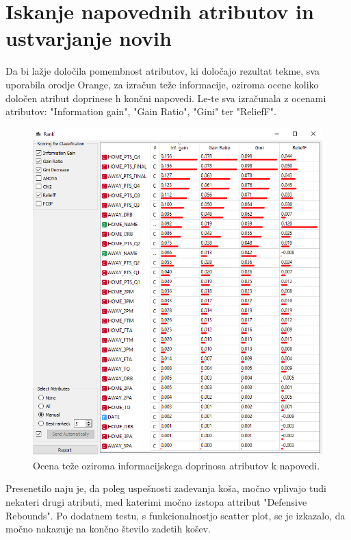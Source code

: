 \documentclass[a4paper,11pt]{article}
\begin{document}
\section{Iskanje napovednih atributov in ustvarjanje novih}

Da bi lažje določila pomembnost atributov, ki določajo rezultat tekme, sva 
uporabila orodje Orange, za izračun teže informacije, oziroma ocene koliko 
določen atribut doprinese h končni napovedi. Le-te sva izračunala z ocenami atributov: 
 "Information gain", "Gain Ratio", "Gini" ter "ReliefF".

\begin{figure}[H]
\begin{center}
\includegraphics[scale=0.3]{OC_ranking_by_inf_gain.png}
\caption{Ocena teže oziroma informacijskega doprinosa atributov k napovedi.}
\label{slika2}
\end{center}
\end{figure} 

Presenetilo naju je, da poleg uspešnosti zadevanja koša, močno vplivajo tudi nekateri 
drugi atributi, med katerimi močno izstopa attribut "Defensive Rebounds". Po dodatnem testu, 
s funkcionalnostjo scatter plot, se je izkazalo, da močno nakazuje na končno število zadetih košev.
\end{document}

